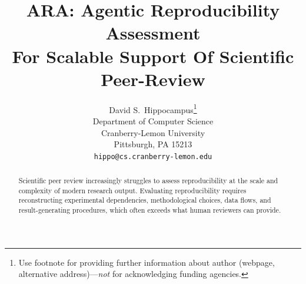 \documentclass{article}
\title{ARA: Agentic Reproducibility Assessment\\For Scalable Support Of Scientific Peer-Review}
\author{%
  David S.~Hippocampus\thanks{Use footnote for providing further information
    about author (webpage, alternative address)---\emph{not} for acknowledging
    funding agencies.} \\
  Department of Computer Science\\
  Cranberry-Lemon University\\
  Pittsburgh, PA 15213 \\
  \texttt{hippo@cs.cranberry-lemon.edu} \\
}
\begin{document}
\maketitle




\begin{abstract}
%
Scientific peer review increasingly struggles to assess reproducibility at the scale and complexity of modern research output.
Evaluating reproducibility requires reconstructing experimental dependencies, methodological choices, data flows, and result-generating procedures, which often exceeds what human reviewers can provide.

\end{abstract}
\end{document}
